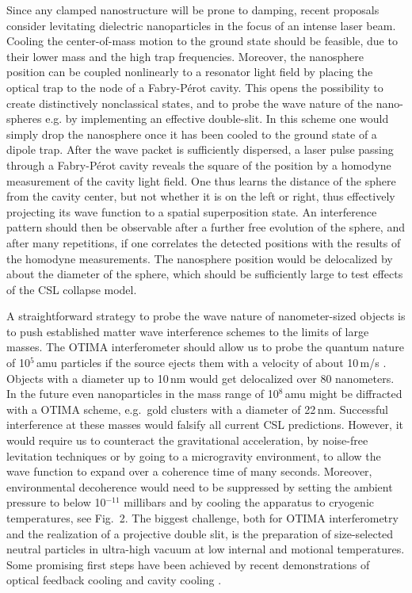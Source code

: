 \documentclass[12pt]{article}
\begin{document}
Since any clamped nanostructure will be prone to damping, recent proposals \cite{Chang2010,Romero-Isart2010,PhysRevA.81.023826} consider levitating dielectric nanoparticles in the focus of an intense laser beam.  
Cooling the center-of-mass motion to the ground state should be feasible, due to their lower mass and the high trap frequencies.
Moreover, the nanosphere position can be coupled nonlinearly to
a resonator light field by placing the optical trap to the node of a Fabry-P{\'e}rot cavity. This opens the possibility to create distinctively nonclassical states, and to probe the wave nature of the nano-spheres e.g. by implementing an effective double-slit\cite{Romero-Isart2011b}.
In this scheme one would simply drop the nanosphere once it has been cooled to the ground state of a dipole trap. After the wave packet is sufficiently dispersed, a laser pulse passing through a Fabry-P{\'e}rot cavity reveals the square of the position by a homodyne measurement of the cavity light field. One thus learns the distance of the sphere from the cavity center, but not whether it is on the left or right, thus effectively projecting its wave function to a spatial superposition state. An interference pattern should then be observable after a further free evolution of the sphere,  and after many repetitions, if one correlates the detected positions with the results of the homodyne measurements.
The nanosphere position would be delocalized by about the diameter of the sphere, which should be sufficiently large to test effects of the CSL collapse model.

A straightforward strategy to probe the wave nature of nanometer-sized objects is to push established matter wave interference schemes to the limits of large masses. The OTIMA interferometer should allow us to probe the quantum nature of  10$^{5}$\,amu particles if the source ejects them with  a velocity of about 10\,m/s \cite{Nimmrichter2011b}. Objects with a diameter up to 10\,nm would get delocalized over 80 nanometers. 
In the future even nanoparticles in the mass range of 10$^{8}$\,amu might be diffracted with a OTIMA scheme, e.g.\ gold clusters with a diameter of 22\,nm.  Successful interference  at these masses would falsify all current CSL predictions\cite{Nimmrichter2011a_PRA_long}.
However, it would require us to counteract the gravitational acceleration, by noise-free levitation techniques or by going to a microgravity environment,
to allow the wave function to expand over a coherence time of many seconds.
Moreover, environmental decoherence would need to be suppressed by setting the ambient pressure to below 10$^{-11}$ millibars and by cooling the apparatus to cryogenic temperatures\cite{Hornberger2012RMP}, see Fig.~2. The biggest challenge, both for OTIMA interferometry and the realization of a projective double slit, is the preparation of size-selected neutral particles in ultra-high vacuum at low internal and motional temperatures.
Some promising  first steps have been achieved by recent demonstrations of optical feedback cooling \cite{Li2011,Gieseler2012} and cavity cooling \cite{kiesel2013cavity, asenbaum2013cavity}.
\end{document}
